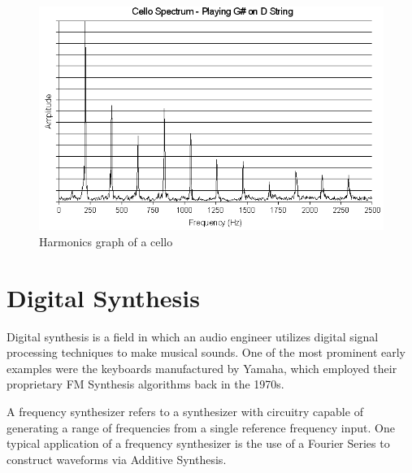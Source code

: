 \documentclass[a4paper,12pt]{report}
\begin{document}
\begin{figure}
    \centering
    \includegraphics[width=36em]{CelloHarmonicsGraph.png}
    \caption{Harmonics graph of a cello}
    \label{fig:CelloHarmonicsGraph}
\end{figure}

\section{Digital Synthesis}
\label{subsec:digitalsynth}
Digital synthesis is a field in which an audio engineer utilizes digital signal processing techniques to make musical sounds. One of the most prominent early examples were the keyboards manufactured by Yamaha, which employed their proprietary FM Synthesis algorithms back in the 1970s.

A frequency synthesizer refers to a synthesizer with circuitry capable of generating a range of frequencies from a single reference frequency input. One typical application of a frequency synthesizer is the use of a Fourier Series to construct waveforms via Additive Synthesis.
\end{document}
